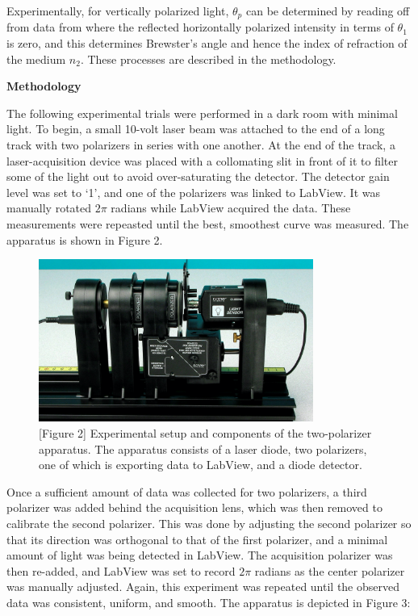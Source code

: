 \documentclass[11pt]{article}
\begin{document}
\begin{multicols}{2}
    Experimentally, for vertically polarized light, $\theta_p$ can be determined by reading off from data from where the reflected horizontally polarized intensity in terms of $\theta_1$ is zero, and this determines Brewster's angle and hence the index of refraction of the medium $n_2$. These processes are described in the methodology.

    \vspace{20pt}

     \selectfont \textbf{Methodology}
    
     \selectfont The following experimental trials were performed in a dark room with minimal light. To begin, a small 10-volt laser beam was attached to the end of a long track with two polarizers in series with one another. At the end of the track, a laser-acquisition device was placed with a collomating slit in front of it to filter some of the light out to avoid over-saturating the detector. The detector gain level was set to `1', and one of the polarizers was linked to LabView. It was manually rotated $2\pi$ radians while LabView acquired the data. These measurements were repeasted until the best, smoothest curve was measured. The apparatus is shown in Figure 2.

    \begin{figure}[H]
        \centering
        \includegraphics[width=9cm]{2 polarizers.png}
        \caption*{[Figure 2] Experimental setup and components of the two-polarizer apparatus. The apparatus consists of a laser diode, two polarizers, one of which is exporting data to LabView, and a diode detector.}
    \end{figure}

    Once a sufficient amount of data was collected for two polarizers, a third polarizer was added behind the acquisition lens, which was then removed to calibrate the second polarizer. This was done by adjusting the second polarizer so that its direction was orthogonal to that of the first polarizer, and a minimal amount of light was being detected in LabView. The acquisition polarizer was then re-added, and LabView was set to record $2\pi$ radians as the center polarizer was manually adjusted. Again, this experiment was repeated until the observed data was consistent, uniform, and smooth. The apparatus is depicted in Figure 3:


\end{multicols}
\end{document}
